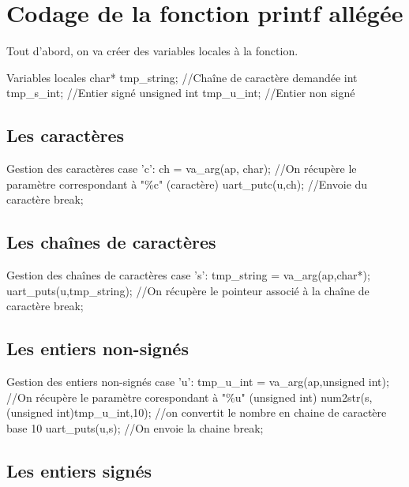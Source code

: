 {\section{Codage de la fonction printf allégée}


Tout d'abord, on va créer des variables locales à la fonction.

\begin{Cpp}{Variables locales}
	char* tmp_string;		//Chaîne de caractère demandée
	int tmp_s_int;			//Entier signé
	unsigned int tmp_u_int; //Entier non signé
\end{Cpp}

\subsection{Les caractères}

\begin{Cpp}{Gestion des caractères}
	case 'c':
		ch = va_arg(ap, char);  	//On récupère le paramètre correspondant à "\%c" (caractère)
	    uart_putc(u,ch); 			//Envoie du caractère
		break;
\end{Cpp}


\subsection{Les chaînes de caractères}

\begin{Cpp}{Gestion des chaînes de caractères}
    case 's':
		tmp_string = va_arg(ap,char*);
		uart_puts(u,tmp_string); //On récupère le pointeur associé à la chaîne de caractère
		break;
\end{Cpp}

\subsection{Les entiers non-signés}

\begin{Cpp}{Gestion des entiers non-signés}
	case 'u':
		tmp_u_int = va_arg(ap,unsigned int);	//On récupère le paramètre corespondant à "\%u" (unsigned int)
		num2str(s,(unsigned int)tmp_u_int,10);	//on convertit le nombre en chaine de caractère base 10
					uart_puts(u,s);							//On envoie la chaine
					break;
\end{Cpp}

\subsection{Les entiers signés}

}
